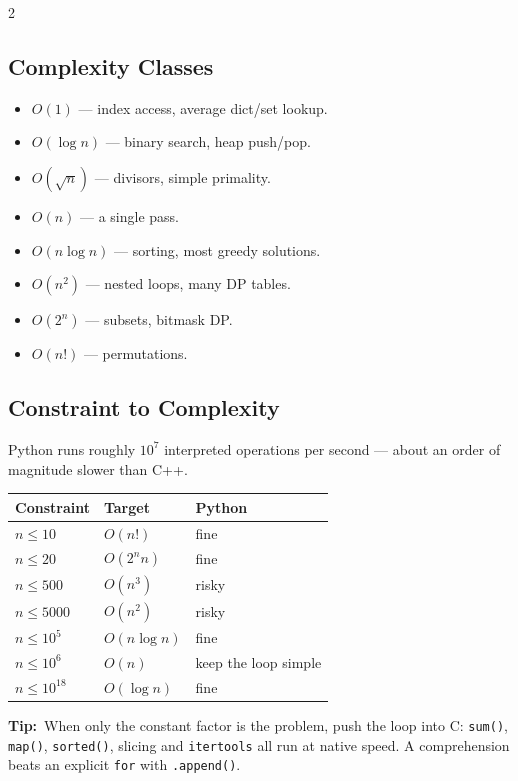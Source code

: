 \documentclass[10pt]{article}
\newcommand{\code}[1]{\texttt{\small #1}}
\newcommand{\tip}[1]{{\color{tipc}\footnotesize\textbf{Tip:}}~{\footnotesize #1}\par}
\begin{document}
\begin{multicols}{2}
\subsection{Complexity Classes}
\begin{itemize}
    \item $O(1)$ --- index access, average dict/set lookup.
    \item $O(\log n)$ --- binary search, heap push/pop.
    \item $O(\sqrt n)$ --- divisors, simple primality.
    \item $O(n)$ --- a single pass.
    \item $O(n \log n)$ --- sorting, most greedy solutions.
    \item $O(n^2)$ --- nested loops, many DP tables.
    \item $O(2^n)$ --- subsets, bitmask DP.
    \item $O(n!)$ --- permutations.
\end{itemize}

\subsection{Constraint to Complexity}
Python runs roughly $10^7$ interpreted operations per second --- about
an order of magnitude slower than C++.
\begin{center}\footnotesize
\begin{tabular}{@{}lll@{}}
\toprule
\textbf{Constraint} & \textbf{Target} & \textbf{Python} \\
\midrule
$n \le 10$      & $O(n!)$          & fine \\
$n \le 20$      & $O(2^n n)$       & fine \\
$n \le 500$     & $O(n^3)$         & risky \\
$n \le 5000$    & $O(n^2)$         & risky \\
$n \le 10^5$    & $O(n \log n)$    & fine \\
$n \le 10^6$    & $O(n)$           & keep the loop simple \\
$n \le 10^{18}$ & $O(\log n)$      & fine \\
\bottomrule
\end{tabular}
\end{center}
\tip{When only the constant factor is the problem, push the loop into C:
\code{sum()}, \code{map()}, \code{sorted()}, slicing and
\code{itertools} all run at native speed. A comprehension beats an
explicit \code{for} with \code{.append()}.}


\end{multicols}
\end{document}

